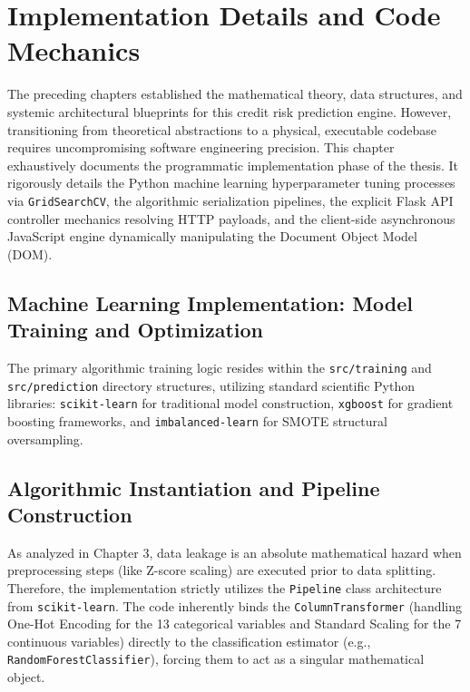 \hypertarget{implementation-details-and-code-mechanics}{%
\section{Implementation Details and Code
Mechanics}\label{implementation-details-and-code-mechanics}}

The preceding chapters established the mathematical theory, data
structures, and systemic architectural blueprints for this credit risk
prediction engine. However, transitioning from theoretical abstractions
to a physical, executable codebase requires uncompromising software
engineering precision. This chapter exhaustively documents the
programmatic implementation phase of the thesis. It rigorously details
the Python machine learning hyperparameter tuning processes via
\texttt{GridSearchCV}, the algorithmic serialization pipelines, the
explicit Flask API controller mechanics resolving HTTP payloads, and the
client-side asynchronous JavaScript engine dynamically manipulating the
Document Object Model (DOM).

\hypertarget{machine-learning-implementation-model-training-and-optimization}{%
\subsection{Machine Learning Implementation: Model Training and
Optimization}\label{machine-learning-implementation-model-training-and-optimization}}

The primary algorithmic training logic resides within the
\texttt{src/training} and \texttt{src/prediction} directory structures,
utilizing standard scientific Python libraries: \texttt{scikit-learn}
for traditional model construction, \texttt{xgboost} for gradient
boosting frameworks, and \texttt{imbalanced-learn} for SMOTE structural
oversampling.

\hypertarget{algorithmic-instantiation-and-pipeline-construction}{%
\subsection{Algorithmic Instantiation and Pipeline
Construction}\label{algorithmic-instantiation-and-pipeline-construction}}

As analyzed in Chapter 3, data leakage is an absolute mathematical
hazard when preprocessing steps (like Z-score scaling) are executed
prior to data splitting. Therefore, the implementation strictly utilizes
the \texttt{Pipeline} class architecture from \texttt{scikit-learn}. The
code inherently binds the \texttt{ColumnTransformer} (handling One-Hot
Encoding for the 13 categorical variables and Standard Scaling for the 7
continuous variables) directly to the classification estimator (e.g.,
\texttt{RandomForestClassifier}), forcing them to act as a singular
mathematical object.

